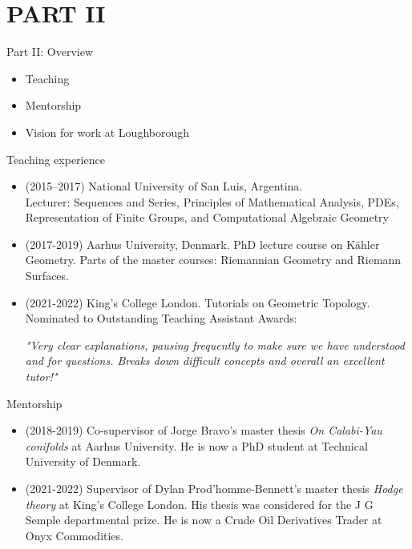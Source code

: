 \documentclass{beamer}
\begin{document}
\section{PART II}

\begin{frame}{Part II: Overview}
	\begin{itemize}
		\item Teaching
		\vspace{5mm}
		\item Mentorship
		\vspace{5mm}
		\item Vision for work at Loughborough
	\end{itemize}
\end{frame}


\begin{frame}{Teaching experience}
	\begin{itemize}
		\item (2015--2017) National University of San Luis, Argentina. \\ Lecturer: Sequences and Series, Principles of Mathematical Analysis, PDEs, Representation of Finite Groups, and Computational Algebraic Geometry 
		\vspace{2mm}
		\item (2017-2019) Aarhus University, Denmark. PhD lecture course on K\"ahler Geometry. Parts of the master courses:  Riemannian Geometry and Riemann Surfaces.
		\vspace{2mm}
		\item (2021-2022) King's College London. Tutorials on Geometric Topology. Nominated to Outstanding Teaching Assistant Awards:
		\begin{center}
			\emph{"Very clear explanations, pausing frequently to make sure we have understood and for questions. Breaks down difficult concepts and overall an excellent tutor!"}
		\end{center}
	\end{itemize}
\end{frame}

\begin{frame}{Mentorship}
	\begin{itemize}
		\item (2018-2019) Co-supervisor of Jorge Bravo's master thesis \emph{On Calabi-Yau conifolds} at Aarhus University. He is now a PhD student at Technical University of Denmark.
		\vspace{5mm}
		\item (2021-2022) Supervisor of Dylan Prod'homme-Bennett's master thesis \emph{Hodge theory} at King's College London. His thesis was considered for the J G Semple departmental prize. He is now a Crude Oil Derivatives Trader at Onyx Commodities.
	\end{itemize}
\end{frame}
\end{document}
